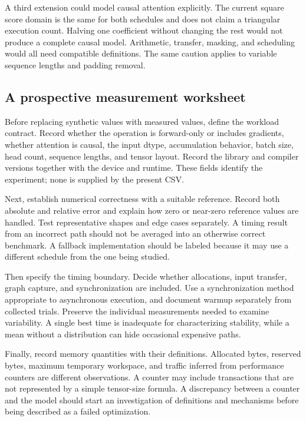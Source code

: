 A third extension could model causal attention explicitly. The current square score domain is the same for both schedules and does not claim a triangular execution count. Halving one coefficient without changing the rest would not produce a complete causal model. Arithmetic, transfer, masking, and scheduling would all need compatible definitions. The same caution applies to variable sequence lengths and padding removal.

\subsection{A prospective measurement worksheet}
Before replacing synthetic values with measured values, define the workload contract. Record whether the operation is forward-only or includes gradients, whether attention is causal, the input dtype, accumulation behavior, batch size, head count, sequence lengths, and tensor layout. Record the library and compiler versions together with the device and runtime. These fields identify the experiment; none is supplied by the present CSV.

Next, establish numerical correctness with a suitable reference. Record both absolute and relative error and explain how zero or near-zero reference values are handled. Test representative shapes and edge cases separately. A timing result from an incorrect path should not be averaged into an otherwise correct benchmark. A fallback implementation should be labeled because it may use a different schedule from the one being studied.

Then specify the timing boundary. Decide whether allocations, input transfer, graph capture, and synchronization are included. Use a synchronization method appropriate to asynchronous execution, and document warmup separately from collected trials. Preserve the individual measurements needed to examine variability. A single best time is inadequate for characterizing stability, while a mean without a distribution can hide occasional expensive paths.

Finally, record memory quantities with their definitions. Allocated bytes, reserved bytes, maximum temporary workspace, and traffic inferred from performance counters are different observations. A counter may include transactions that are not represented by a simple tensor-size formula. A discrepancy between a counter and the model should start an investigation of definitions and mechanisms before being described as a failed optimization.

